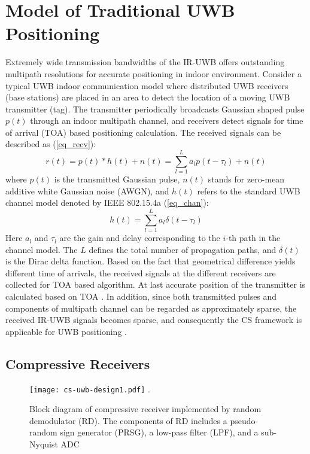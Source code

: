 \section{Model of Traditional UWB Positioning}

\indent \indent Extremely wide transmission bandwidths of the IR-UWB offers outstanding multipath resolutions for accurate positioning in indoor environment. Consider a typical UWB indoor communication model where distributed UWB receivers (base stations) are placed in an area to detect the location of a moving UWB transmitter (tag). The transmitter periodically broadcasts Gaussian shaped pulse $p(t)$ through an indoor multipath channel, and receivers detect signals for time of arrival (TOA) based positioning calculation. The received signals can be described as (\ref{eq_recv}):
\begin{equation}
\label{eq_recv}
r(t) = p(t) * h(t) + n(t) = \sum_{l=1}^{L} a_l p(t-\tau_l) + n(t) 
\end{equation}
where $p(t)$ is the transmitted Gaussian pulse, $n(t)$ stands for zero-mean additive white Gaussian noise (AWGN), and $h(t)$ refers to the standard UWB channel model denoted by IEEE 802.15.4a (\ref{eq_chan}):
\begin{equation}
\label{eq_chan}
h(t) = \sum_{l=1}^{L} a_l \delta(t-\tau_l)
\end{equation}
Here $a_l$ and $\tau_l$ are the gain and delay corresponding to the $i$-th path in the channel model. The $L$ defines the total number of propagation paths, and $\delta(t)$ is the Dirac delta function. Based on the fact that geometrical difference yields different time of arrivals, the received signals at the different receivers are collected for TOA based algorithm. At last accurate position of the transmitter is calculated based on TOA \cite{d2010toa}. In addition, since both transmitted pulses and components of multipath channel can be regarded as approximately sparse, the received IR-UWB signals becomes sparse, and consequently the CS framework is applicable for UWB positioning \cite{yang2011compressive}. 

\subsection{Compressive Receivers}

\begin{figure}[!t]
\centering
\texttt{[image: cs-uwb-design1.pdf]}
\DeclareGraphicsExtensions.
\caption{Block diagram of compressive receiver implemented by random demodulator (RD). The components of RD includes a pseudo-random sign generator (PRSG), a low-pass filter (LPF), and a sub-Nyquist ADC}
\label{cs-uwb-design1}
\end{figure}

